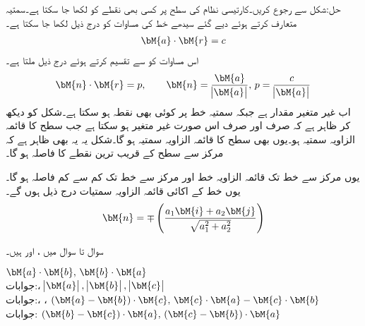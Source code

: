 حل:شکل  سے رجوع کریں۔کارتیسی نظام کی  سطح پر کسی بھی نقطے کو  لکھا جا سکتا ہے۔سمتیہ  متعارف کرتے ہوئے دیے گئے سیدھے خط کی مساوات کو درج ذیل لکھا جا سکتا ہے۔
\begin{align*}
\bM{a}\cdot \bM{r}=c
\end{align*} 
اس مساوات کو  سے تقسیم کرتے ہوئے درج ذیل ملتا ہے۔
\begin{align*}
\bM{n}\cdot \bM{r}=p,\quad \quad \bM{n}=\frac{\bM{a}}{\abs{\bM{a}}},\, p=\frac{c}{\abs{\bM{a}}}
\end{align*}
اب  غیر متغیر مقدار ہے جبکہ سمتیہ  خط پر کوئی بھی نقطہ ہو سکتا ہے۔شکل کو دیکھ کر ظاہر ہے کہ  صرف اور صرف اس صورت غیر متغیر ہو سکتا ہے جب  سطح کا قائمہ الزاویہ سمتیہ ہو۔یوں  بھی سطح کا قائمہ الزاویہ سمتیہ ہو گا۔شکل یہ یہ بھی ظاہر ہے کہ مرکز سے سطح کے قریب ترین نقطے کا فاصلہ  ہو گا۔

یوں مرکز سے خط تک قائمہ الزاویہ خط  اور مرکز سے خط تک کم سے کم فاصلہ  ہو گا۔یوں خط کے اکائی قائمہ الزاویہ سمتیات درج ذیل ہوں گے۔
\begin{align*}
\bM{n}=\mp \left(\frac{a_1\bM{i}+a_2\bM{j}}{\sqrt{a_1^2+a_2^2}}\right)
\end{align*} 

سوال  تا سوال  میں ،  اور  ہیں۔

\quad
$\bM{a}\cdot \bM{b},\, \bM{b}\cdot\bM{a}$\\

جوابات:، 
\quad
$\abs{\bM{a}},\, \abs{\bM{b}},\, \abs{\bM{c}}$\\

جوابات:، ، 
\quad
$(\bM{a}-\bM{b})\cdot \bM{c},\, \bM{c}\cdot\bM{a}-\bM{c}\cdot \bM{b}$\\

جوابات:
\quad
$(\bM{b}-\bM{c})\cdot \bM{a},\, (\bM{c}-\bM{b})\cdot \bM{a}$\\

